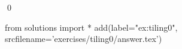 
\begin{ex} 
  \label{ex:tiling0}
  
  \qed
\end{ex} 
\begin{python0}
from solutions import *
add(label="ex:tiling0",
    srcfilename='exercises/tiling0/answer.tex') 
\end{python0}
